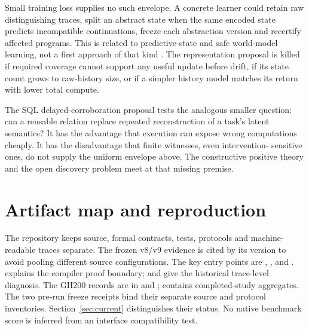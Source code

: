\documentclass[10pt,twocolumn]{article}
\begin{document}
Small training loss supplies no such envelope. A concrete learner could retain
raw distinguishing traces, split an abstract state when the same encoded state
predicts incompatible continuations, freeze each abstraction version and
recertify affected programs. This is related to predictive-state and safe
world-model learning, not a first approach of that kind
\citep{singh2004psr,delgrange2026deepspi}. The representation proposal is killed
if required coverage cannot support any useful update before drift, if its
state count grows to raw-history size, or if a simpler history model matches
its return with lower total compute.

The SQL delayed-corroboration proposal tests the analogous smaller question:
can a reusable relation replace repeated reconstruction of a task's latent
semantics? It has the advantage that execution can expose wrong computations
cheaply. It has the disadvantage that finite witnesses, even intervention-
sensitive ones, do not supply the uniform envelope above. The constructive
positive theory and the open discovery problem meet at that missing premise.

\section{Artifact map and reproduction}
The repository keeps source, formal contracts, tests, protocols and machine-readable traces separate. The frozen v8/v9 evidence is cited by its version to
avoid pooling different source configurations. The key entry points are
,
, and
.
 explains the compiler proof boundary;
 and  give the
historical trace-level diagnosis. The GH200 records are in
 and
;
 contains completed-study aggregates. The two
pre-run freeze receipts bind their separate source and protocol inventories.
Section~\ref{sec:current} distinguishes their status. No native benchmark
score is inferred from an
interface compatibility test.
\end{document}
